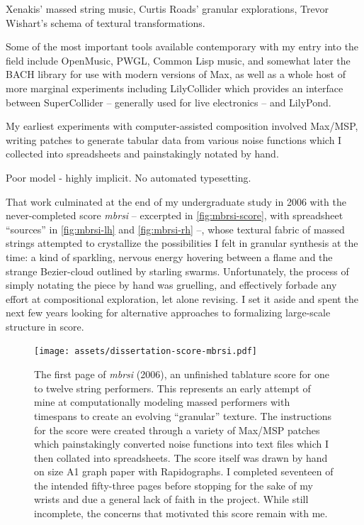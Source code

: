 Xenakis' massed string music, Curtis Roads' granular explorations, Trevor
Wishart's schema of textural transformations.

Some of the most important tools available contemporary with my entry into the
field include OpenMusic, PWGL, Common Lisp music, and somewhat later the BACH
library for use with modern versions of Max, as well as a whole host of more
marginal experiments including LilyCollider which provides an interface between
SuperCollider -- generally used for live electronics -- and LilyPond.

My earliest experiments with computer-assisted composition involved Max/MSP,
writing patches to generate tabular data from various noise functions which I
collected into spreadsheets and painstakingly notated by hand.

Poor model - highly implicit. No automated typesetting.

That work culminated at the end of my undergraduate study in 2006 with the
never-completed score \emph{mbrsi} -- excerpted in \autoref{fig:mbrsi-score},
with spreadsheet \enquote{sources} in \autoref{fig:mbrsi-lh} and
\autoref{fig:mbrsi-rh} --, whose textural fabric of massed strings attempted to
crystallize the possibilities I felt in granular synthesis at the time: a kind
of sparkling, nervous energy hovering between a flame and the strange
Bezier-cloud outlined by starling swarms. Unfortunately, the process of simply
notating the piece by hand was gruelling, and effectively forbade any effort at
compositional exploration, let alone revising. I set it aside and spent the
next few years looking for alternative approaches to formalizing large-scale
structure in score.

\begin{figure}[H]
\begin{centering}
\texttt{[image: assets/dissertation-score-mbrsi.pdf]}
\caption{The first page of \emph{mbrsi} (2006), an unfinished tablature score
for one to twelve string performers. This represents an early attempt of mine
at computationally modeling massed performers with timespans to create an
evolving \enquote{granular} texture. The instructions for the score were
created through a variety of Max/MSP patches which painstakingly converted
noise functions into text files which I then collated into spreadsheets. The
score itself was drawn by hand on size A1 graph paper with Rapidographs.
I completed seventeen of the intended fifty-three pages before stopping for the
sake of my wrists and due a general lack of faith in the project. While still
incomplete, the concerns that motivated this score remain with me.}
\label{fig:mbrsi-score}
\end{centering} 
\end{figure}

